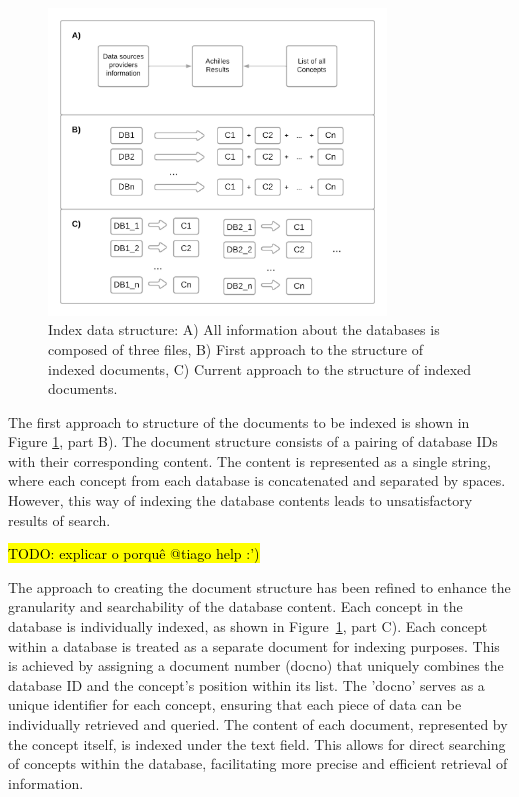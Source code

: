 \begin{figure}[ht]
    \includegraphics[width=0.8\textwidth]{figs/chapter3/index_struct.png}
    \centering
    \caption{Index data structure: A) All information about the databases is composed of three files, B) First approach to the structure of indexed documents, C) Current approach to the structure of indexed documents.}
    \label{fig_struct}
\end{figure}


The first approach to structure of the documents to be indexed is shown in Figure \ref{fig_struct}, part B). The document structure consists of a pairing of database IDs with their corresponding content. The content is represented as a single string, where each concept from each database is concatenated and separated by spaces. However, this way of indexing the database contents leads to unsatisfactory results of search.

\hl{TODO: explicar o porquê @tiago help :')}

The approach to creating the document structure has been refined to enhance the granularity and searchability of the database content. Each concept in the database is individually indexed, as shown in Figure~\ref{fig_struct}, part C). Each concept within a database is treated as a separate document for indexing purposes. This is achieved by assigning a document number (docno) that uniquely combines the database ID and the concept's position within its list. The 'docno' serves as a unique identifier for each concept, ensuring that each piece of data can be individually retrieved and queried. The content of each document, represented by the concept itself, is indexed under the text field. This allows for direct searching of concepts within the database, facilitating more precise and efficient retrieval of information. 


